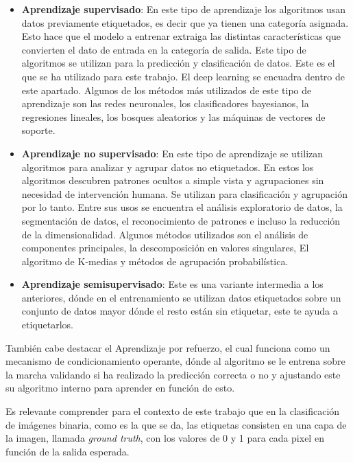 \begin{itemize}
	\item\textbf{Aprendizaje supervisado}: En este tipo de aprendizaje los algoritmos usan datos previamente etiquetados, es decir que ya tienen una categoría asignada. Esto hace que el modelo a entrenar extraiga las distintas características que convierten el dato de entrada en la categoría de salida. Este tipo de algoritmos se utilizan para la predicción y clasificación de datos. Este es el que se ha utilizado para este trabajo. El deep learning se encuadra dentro de este apartado. Algunos de los métodos más utilizados de este tipo de aprendizaje son las redes neuronales, los clasificadores bayesianos, la regresiones lineales, los bosques aleatorios y las máquinas de vectores de soporte.
	
	\item\textbf{Aprendizaje no supervisado}: En este tipo de aprendizaje se utilizan algoritmos para analizar y agrupar datos no etiquetados. En estos los algoritmos descubren patrones ocultos a simple vista y agrupaciones sin necesidad de intervención humana. Se utilizan para clasificación y agrupación por lo tanto. Entre sus usos se encuentra el análisis exploratorio de datos, la segmentación de datos, el reconocimiento de patrones e incluso la reducción de la dimensionalidad. Algunos métodos utilizados son el análisis de componentes principales, la descomposición en valores singulares, El algoritmo de K-medias y métodos de agrupación probabilística.
	
	\item\textbf{Aprendizaje semisupervisado}:  Este es una variante intermedia a los anteriores, dónde en el entrenamiento se utilizan datos etiquetados sobre un conjunto de datos mayor dónde el resto están sin etiquetar, este te ayuda a etiquetarlos.

\end{itemize}

También cabe destacar el Aprendizaje por refuerzo, el cual funciona como un mecanismo de condicionamiento operante, dónde al algoritmo se le entrena sobre la marcha validando si ha realizado la predicción correcta o no y ajustando este su algoritmo interno para aprender en función de esto.

Es relevante comprender para el contexto de este trabajo que en la clasificación de imágenes binaria, como es la que se da, las etiquetas consisten en una capa de la imagen, llamada \textit{ground truth}, con los valores de 0 y 1 para cada pixel en función de la salida esperada.

